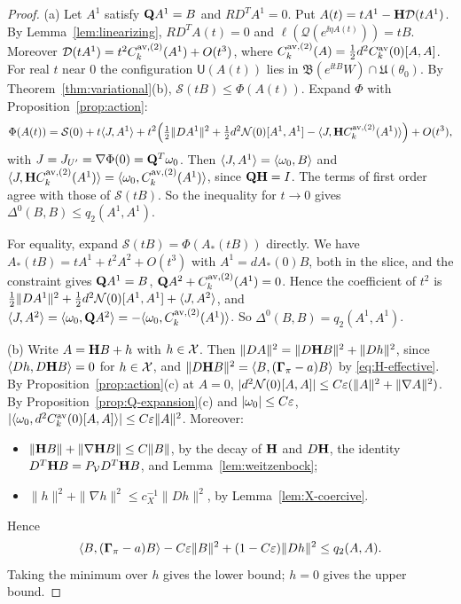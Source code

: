 \begin{proof}
(a) Let $A^1$ satisfy $\mathbf Q A^1=B$ and $RD^TA^1=0$. Put $A(t)=tA^1-\mathbf H\mathcal D(tA^1)$. By Lemma~\ref{lem:linearizing}, $RD^TA(t)=0$ and $\ell(\mathcal Q(e^{\ii\eta A(t)}))=tB$. Moreover $\mathcal D(tA^1)=t^2C^{{\rm av},(2)}_k(A^1)+O(t^3)$, where $C^{{\rm av},(2)}_k(A)=\frac12d^2C^{\rm av}_k(0)[A,A]$. For real $t$ near $0$ the configuration $\mathsf U(A(t))$ lies in $\mathfrak B(e^{\ii tB}W)\cap\mathfrak U(\theta_0)$. By Theorem~\ref{thm:variational}(b), $\mathcal S(tB)\le\Phi(A(t))$. Expand $\Phi$ with Proposition~\ref{prop:action}:
\[
\Phi(A(t))=\mathcal S(0)+t\langle J,A^1\rangle+t^2\Big(\tfrac12\|DA^1\|^2+\tfrac12d^2\mathcal N(0)[A^1,A^1]-\langle J,\mathbf H C^{{\rm av},(2)}_k(A^1)\rangle\Big)+O(t^3),
\]
with $J=J_{U'}=\nabla\Phi(0)=\mathbf Q^T\omega_0$. Then $\langle J,A^1\rangle=\langle \omega_0,B\rangle$ and $\langle J,\mathbf H C^{{\rm av},(2)}_k(A^1)\rangle=\langle \omega_0,C^{{\rm av},(2)}_k(A^1)\rangle$, since $\mathbf Q\mathbf H=I$. The terms of first order agree with those of $\mathcal S(tB)$. So the inequality for $t\to0$ gives $\Delta^0(B,B)\le q_2(A^1,A^1)$.

For equality, expand $\mathcal S(tB)=\Phi(A_*(tB))$ directly. We have $A_*(tB)=tA^1+t^2A^2+O(t^3)$ with $A^1=dA_*(0)B$, both in the slice, and the constraint gives $\mathbf Q A^1=B$, $\mathbf Q A^2+C^{{\rm av},(2)}_k(A^1)=0$. Hence the coefficient of $t^2$ is $\frac12\|DA^1\|^2+\frac12d^2\mathcal N(0)[A^1,A^1]+\langle J,A^2\rangle$, and $\langle J,A^2\rangle=\langle \omega_0,\mathbf Q A^2\rangle=-\langle \omega_0,C^{{\rm av},(2)}_k(A^1)\rangle$. So $\Delta^0(B,B)=q_2(A^1,A^1)$.

(b) Write $A=\mathbf H B+h$ with $h\in\mathcal X$. Then $\|DA\|^2=\|D\mathbf H B\|^2+\|Dh\|^2$, since $\langle Dh,D\mathbf H B\rangle=0$ for $h\in\mathcal X$, and $\|D\mathbf H B\|^2=\langle B,(\boldsymbol\Gamma_\pi-a)B\rangle$ by \eqref{eq:H-effective}. By Proposition~\ref{prop:action}(c) at $A=0$, $|d^2\mathcal N(0)[A,A]|\le C\varepsilon(\|A\|^2+\|\nabla A\|^2)$. By Proposition~\ref{prop:Q-expansion}(c) and $|\omega_0|\le C\varepsilon$, $|\langle \omega_0,d^2C^{\rm av}_k(0)[A,A]\rangle|\le C\varepsilon\|A\|^2$. Moreover:
\begin{itemize}
\item $\|\mathbf H B\|+\|\nabla\mathbf H B\|\le C\|B\|$, by the decay of $\mathbf H$ and $D\mathbf H$, the identity $D^T\mathbf H B=P_\mathcal V D^T\mathbf H B$, and Lemma~\ref{lem:weitzenbock};
\item $\|h\|^2+\|\nabla h\|^2\le c_X^{-1}\|Dh\|^2$, by Lemma~\ref{lem:X-coercive}.
\end{itemize}
Hence
\[
\langle B,(\boldsymbol\Gamma_\pi-a)B\rangle-C\varepsilon\|B\|^2+(1-C\varepsilon)\|Dh\|^2\le q_2(A,A).
\]
Taking the minimum over $h$ gives the lower bound; $h=0$ gives the upper bound.


\end{proof}
